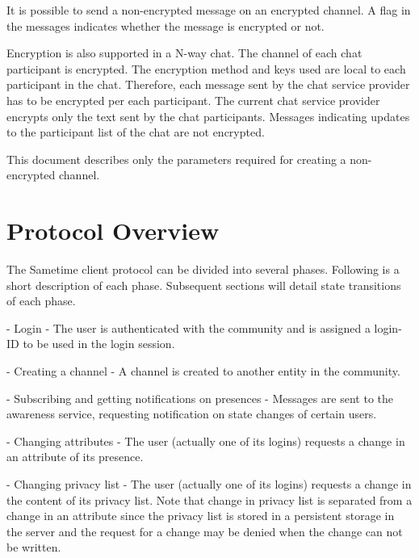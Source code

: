 \documentclass[titlepage,oneside]{book}
\begin{document}
\par{} It is possible to send a non-encrypted message on an encrypted
channel. A flag in the messages indicates whether the message is
encrypted or not.

\par{} Encryption is also supported in a N-way chat. The channel of
each chat participant is encrypted. The encryption method and keys
used are local to each participant in the chat. Therefore, each
message sent by the chat service provider has to be encrypted per each
participant. The current chat service provider encrypts only the text
sent by the chat participants. Messages indicating updates to the
participant list of the chat are not encrypted.

\par{} This document describes only the parameters required for
creating a non-encrypted channel.

\chapter{Protocol Overview}

\par{} The Sametime client protocol can be divided into several
phases.  Following is a short description of each phase. Subsequent
sections will detail state transitions of each phase.

\par{} - Login - The user is authenticated with the community and is
assigned a login-ID to be used in the login session.

\par{} - Creating a channel - A channel is created to another entity
in the community.

\par{} - Subscribing and getting notifications on presences - Messages
are sent to the awareness service, requesting notification on state
changes of certain users.

\par{} - Changing attributes - The user (actually one of its logins)
requests a change in an attribute of its presence.

\par{} - Changing privacy list - The user (actually one of its logins)
requests a change in the content of its privacy list. Note that change
in privacy list is separated from a change in an attribute since the
privacy list is stored in a persistent storage in the server and the
request for a change may be denied when the change can not be written.
\end{document}

